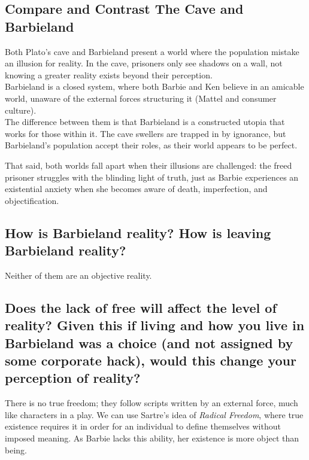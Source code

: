 
\subsection{Compare and Contrast The Cave and Barbieland}

Both Plato's cave and Barbieland present a world where the population
mistake an illusion for reality. In the cave, prisoners only see shadows on a wall,
not knowing a greater reality exists beyond their perception. \\

Barbieland is a closed system, where both Barbie and Ken believe in an 
amicable world, unaware of the external forces structuring it (Mattel and consumer culture). \\

The difference between them is that Barbieland is a constructed utopia that works for those within it.
The cave swellers are trapped in by ignorance, but Barbieland's population accept their roles, as their world 
appears to be perfect. 

That said, both worlds fall apart when their illusions are challenged: the freed prisoner struggles with
the blinding light of truth, just as Barbie experiences an existential anxiety when she becomes aware of death,
imperfection, and objectification.

\subsection{How is Barbieland reality? How is leaving Barbieland reality?}

Neither of them are an objective reality. 

\subsection{Does the lack of free will affect the level of reality? Given this if living and
how you live in Barbieland was a choice (and not assigned by some corporate hack), would this change
your perception of reality?}

There is no true freedom; they follow scripts written by an external force, much like characters in a play. 
We can use Sartre's idea of \textit{Radical Freedom}, where true existence requires it in order for an individual 
to define themselves without imposed meaning. As Barbie lacks this ability, her existence is more object
than being.

